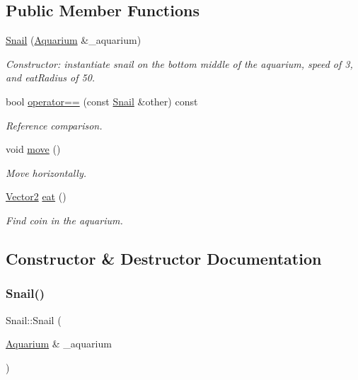 \subsection*{Public Member Functions}
\begin{DoxyCompactItemize}
\item 
\mbox{\hyperlink{class_snail_acda391321646989553f4547dd793fa9c}{Snail}} (\mbox{\hyperlink{class_aquarium}{Aquarium}} \&\+\_\+aquarium)
\begin{DoxyCompactList}\small\item\em Constructor\+: instantiate snail on the bottom middle of the aquarium, speed of 3, and eat\+Radius of 50. \end{DoxyCompactList}\item 
bool \mbox{\hyperlink{class_snail_ab01308256de08e789ca752e1608120f7}{operator==}} (const \mbox{\hyperlink{class_snail}{Snail}} \&other) const
\begin{DoxyCompactList}\small\item\em Reference comparison. \end{DoxyCompactList}\item 
void \mbox{\hyperlink{class_snail_af5892ec122d9199480c813b74488256b}{move}} ()
\begin{DoxyCompactList}\small\item\em Move horizontally. \end{DoxyCompactList}\item 
\mbox{\hyperlink{struct_vector2}{Vector2}} \mbox{\hyperlink{class_snail_a0905a469c6333970b8246abca37795f1}{eat}} ()
\begin{DoxyCompactList}\small\item\em Find coin in the aquarium. \end{DoxyCompactList}\end{DoxyCompactItemize}


\subsection{Constructor \& Destructor Documentation}
\mbox{\label{class_snail_acda391321646989553f4547dd793fa9c}} 
\subsubsection{\texorpdfstring{Snail()}{Snail()}}
{\footnotesize\ttfamily Snail\+::\+Snail (\begin{DoxyParamCaption}\item[{\mbox{\hyperlink{class_aquarium}{Aquarium}} \&}]{\+\_\+aquarium }\end{DoxyParamCaption})}



